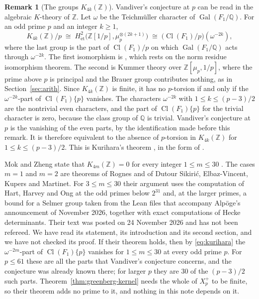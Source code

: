 \documentclass[11pt]{article}
\theoremstyle{definition}
\newtheorem{remark}[theorem]{Remark}
\numberwithin{equation}{section}
\begin{document}
\begin{remark}[The groups $K_{4k}(\mathbb Z)$]\label{rem:ktheory}
Vandiver's conjecture at $p$ can be read in the algebraic $K$-theory of $\mathbb Z$. Let $\omega$ be the
Teichm\"uller character of $\operatorname{Gal}(F_1/\mathbb Q)$. For an odd prime $p$ and an integer $k\ge1$,
\begin{equation}\label{eq:kurihara}
 K_{4k}(\mathbb Z)/p\;\cong\;H^2_{\mathrm{\acute et}}\bigl(\mathbb Z[1/p],\mu_p^{\otimes(2k+1)}\bigr)
 \;\cong\;\bigl(\operatorname{Cl}(F_1)/p\bigr)(\omega^{-2k}),
\end{equation}
where the last group is the part of $\operatorname{Cl}(F_1)/p$ on which $\operatorname{Gal}(F_1/\mathbb Q)$ acts
through $\omega^{-2k}$. The first isomorphism is \cite[Chapter~VI, Corollary~8.3]{WeibelKbook}, which rests on
the norm residue isomorphism theorem. The second is Kummer theory over $\mathbb Z[\mu_p,1/p]$, where the prime
above $p$ is principal and the Brauer group contributes nothing, as in Section~\ref{sec:arith}. Since
$K_{4k}(\mathbb Z)$ is finite, it has no $p$-torsion if and only if the $\omega^{-2k}$-part of
$\operatorname{Cl}(F_1)\{p\}$ vanishes. The characters $\omega^{-2k}$ with $1\le k\le(p-3)/2$ are the nontrivial
even characters, and the part of $\operatorname{Cl}(F_1)\{p\}$ for the trivial character is zero, because the
class group of $\mathbb Q$ is trivial. Vandiver's conjecture at $p$ is the vanishing of the even parts, by the
identification made before this remark. It is therefore equivalent to the absence of $p$-torsion in
$K_{4k}(\mathbb Z)$ for $1\le k\le(p-3)/2$. This is Kurihara's theorem \cite{Kurihara1992}, in the form of
\cite[Chapter~VI, Theorem~10.9]{WeibelKbook}.

Mok and Zheng state that $K_{4m}(\mathbb Z)=0$ for every integer $1\le m\le30$
\cite[Theorem~1]{MokZheng2026}. The cases $m=1$ and $m=2$ are theorems of Rognes and of Dutour Sikiri\'c,
Elbaz-Vincent, Kupers and Martinet. For $3\le m\le30$ their argument uses the computation of Hart, Harvey and Ong
at the odd primes below $2^{31}$ and, at the larger primes, a bound for a Selmer group taken from the Lean files that
accompany Alp\"oge's announcement of November 2026, together with exact computations of Hecke determinants. Their
text was posted on 24 November 2026 and has not been refereed. We have read its statement, its introduction and
its second section, and we have not checked its proof. If their theorem holds, then by \eqref{eq:kurihara} the
$\omega^{-2m}$-part of $\operatorname{Cl}(F_1)\{p\}$ vanishes for $1\le m\le30$ at every odd prime $p$. For
$p\le61$ these are all the parts that Vandiver's conjecture concerns, and the conjecture was already known
there; for larger $p$ they are $30$ of the $(p-3)/2$ such parts. Theorem~\ref{thm:greenberg-kernel} needs the
whole of $X_p^+$ to be finite, so their theorem adds no prime to it, and nothing in this note depends on it.
\end{remark}
\end{document}
